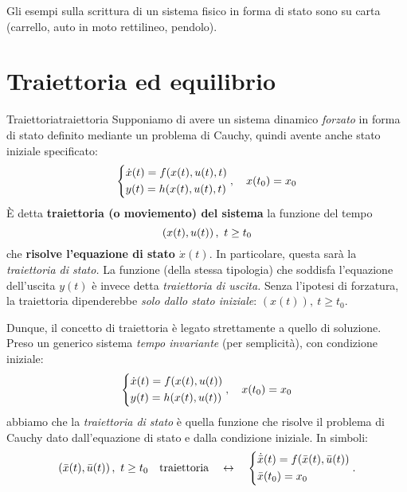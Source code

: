 \documentclass[a4paper]{report}
\begin{document}
\bb
Gli esempi sulla scrittura di un sistema fisico in forma di stato sono su carta (carrello, auto in moto rettilineo, pendolo).

\section{Traiettoria ed equilibrio}
\begin{defin}{Traiettoria}{traiettoria}
Supponiamo di avere un sistema dinamico \textit{forzato} in forma di stato definito mediante un problema di Cauchy, quindi avente anche stato iniziale specificato:
\begin{equation*}
	\begin{dcases}
		\dot x(t) = f(x(t), u(t), t) \\
		y(t) = h(x(t), u(t), t)
	\end{dcases}, \quad x(t_0)  =x_0
\end{equation*}
È detta \textbf{traiettoria (o moviemento) del sistema} la funzione del tempo 
\begin{equation}
\left( x(t), u(t) \right), \ t \geq t_0
\end{equation}
che \textbf{risolve l'equazione di stato $\dot x(t)$}. In particolare, questa sarà la \textit{traiettoria di stato.} La funzione (della stessa tipologia) che soddisfa l'equazione dell'uscita $y(t)$ è invece detta \textit{traiettoria di uscita.} 
\bb
Senza l'ipotesi di forzatura, la traiettoria dipenderebbe \textit{solo dallo stato iniziale}: $(x(t)), \ t \geq t_0$.
\end{defin}

Dunque, il concetto di traiettoria è legato strettamente a quello di soluzione. Preso un generico sistema \textit{tempo invariante} (per semplicità), con condizione iniziale:
\begin{equation*}
	\begin{dcases}
		\dot x(t) = f(x(t), u(t)) \\
		y(t) = h(x(t), u(t))
	\end{dcases}, \quad x(t_0) = x_0
\end{equation*}
abbiamo che la \textit{traiettoria di stato} è quella funzione che risolve il problema di Cauchy dato dall'equazione di stato e dalla condizione iniziale. In simboli:
\begin{equation*}
	\paren{\bar x(t), \bar u(t)}, \ t\geq t_0 \quad \textrm{traiettoria} \quad \leftrightarrow \quad \begin{dcases}
		\dot{\bar x}(t) = f(\bar x(t), \bar u(t)) \\
		\bar x(t_0) = x_0
	\end{dcases}.
\end{equation*}
\end{document}
